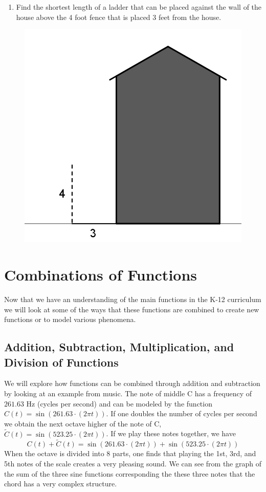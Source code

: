\documentclass[
]{book}
\providecommand{\tightlist}{%
  \setlength{\itemsep}{0pt}\setlength{\parskip}{0pt}}
\theoremstyle{definition}
\theoremstyle{definition}
\theoremstyle{definition}
\theoremstyle{remark}
\begin{document}
\begin{enumerate}
\def\labelenumi{\arabic{enumi}.}
\setcounter{enumi}{1}
\tightlist
\item
  Find the shortest length of a ladder that can be placed against the wall of the house above the 4 foot fence that is placed 3 feet from the house.
\end{enumerate}

\begin{figure}

{\centering \includegraphics[width=0.3\linewidth]{images/ladder} 

}

\end{figure}

\hypertarget{sec:Function-combinations}{%
\section{Combinations of Functions}\label{sec:Function-combinations}}

Now that we have an understanding of the main functions in the K-12 curriculum we will look at some of the ways that these functions are combined to create new functions or to model various phenomena.

\hypertarget{addition-subtraction-multiplication-and-division-of-functions}{%
\subsection{Addition, Subtraction, Multiplication, and Division of Functions}\label{addition-subtraction-multiplication-and-division-of-functions}}

We will explore how functions can be combined through addition and subtraction by looking at an example from music. The note of middle C has a frequency of \(261.63\) Hz (cycles per second) and can be modeled by the function \(C(t)=\sin\left(261.63 \cdot (2\pi t)\right)\). If one doubles the number of cycles per second we obtain the next octave higher of the note of C, \(\tilde{C}(t) = \sin\left( 523.25 \cdot (2\pi t)\right)\). If we play these notes together, we have
\[C(t)+ \tilde{C}(t) = \sin\left(261.63 \cdot (2\pi t)\right)+ \sin\left( 523.25 \cdot (2\pi t)\right)\]
When the octave is divided into 8 parts, one finds that playing the 1st, 3rd, and 5th notes of the scale creates a very pleasing sound. We can see from the graph of the sum of the three sine functions corresponding the these three notes that the chord has a very complex structure.
\end{document}
